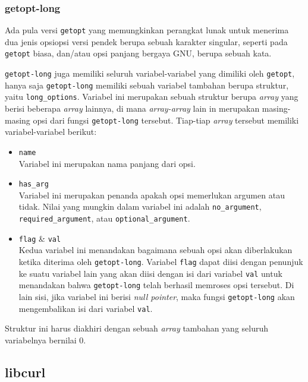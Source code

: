 \subsubsection{getopt-long}
\label{sec:cmodules-getopt-long}

Ada pula versi \verb|getopt| yang memungkinkan perangkat lunak untuk menerima dua jenis opsi\textemdash opsi versi pendek berupa sebuah karakter singular, seperti pada \verb|getopt| biasa, dan/atau opsi panjang bergaya GNU, berupa sebuah kata.

\verb|getopt-long| juga memiliki seluruh variabel-variabel yang dimiliki oleh \verb|getopt|, hanya saja \verb|getopt-long| memiliki sebuah variabel tambahan berupa struktur, yaitu \verb|long_options|. Variabel ini merupakan sebuah struktur berupa \textit{array} yang berisi beberapa \textit{array} lainnya, di mana \textit{array-array} lain in merupakan masing-masing opsi dari fungsi \verb|getopt-long| tersebut. Tiap-tiap \textit{array} tersebut memiliki variabel-variabel berikut:

\begin{itemize}
	\item \verb|name|\\
	Variabel ini merupakan nama panjang dari opsi.
	\item \verb|has_arg|\\
	Variabel ini merupakan penanda apakah opsi memerlukan argumen atau tidak. Nilai yang mungkin dalam variabel ini adalah \verb|no_argument|, \verb|required_argument|, atau \verb|optional_argument|.
	\item \verb|flag| \& \verb|val|\\ 
	Kedua variabel ini menandakan bagaimana sebuah opsi akan diberlakukan ketika diterima oleh \verb|getopt-long|. Variabel \verb|flag| dapat diisi dengan penunjuk ke suatu variabel lain yang akan diisi dengan isi dari variabel \verb|val| untuk menandakan bahwa \verb|getopt-long| telah berhasil memroses opsi tersebut. Di lain sisi, jika variabel ini berisi \textit{null pointer}, maka fungsi \verb|getopt-long| akan mengembalikan isi dari variabel \verb|val|.
\end{itemize}
\noindent
Struktur ini harus diakhiri dengan sebuah \textit{array} tambahan yang seluruh variabelnya bernilai 0.

\subsection{libcurl \cite{stenberg:2022:everythingcurl}}
\label{sec:cmodules-libcurl}

